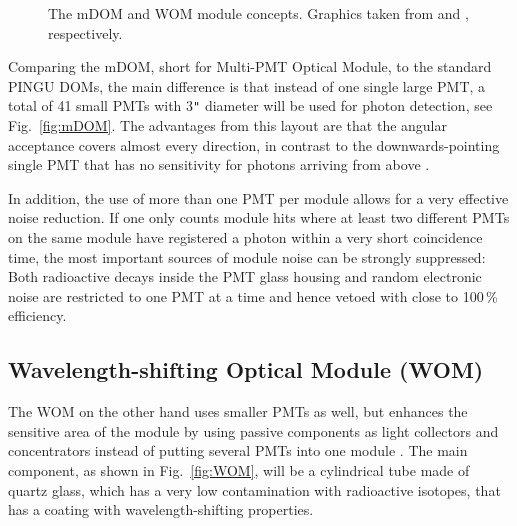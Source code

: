 
\begin{figure}
\centering
  \qquad
  \caption{The \protect{} mDOM and \protect{} WOM
    module concepts. Graphics taken from \cite{mDOM_Geneva} and \cite{WOM_ICRC},
    respectively.}
\label{fig:Gen3modules}
\end{figure}

Comparing the mDOM, short for Multi-PMT Optical Module, to the standard PINGU
DOMs, the main difference is that instead of one single large PMT, a total of
41 small PMTs with 3\verb+"+ diameter will be used for photon detection, see
Fig.~\ref{fig:mDOM}. The advantages from this layout are that the angular
acceptance covers almost every direction, in contrast to the downwards-pointing
single PMT that has no sensitivity for photons arriving from above
\cite{mDOM_Geneva}.

In addition, the use of more than one PMT per module allows for a very
effective noise reduction. If one only counts module hits where at least two
different PMTs on the same module have registered a photon within a very short
coincidence time, the most important sources of module noise can be strongly
suppressed: Both radioactive decays inside the PMT glass housing and random
electronic noise are restricted to one PMT at a time and hence vetoed with
close to 100\,\% efficiency.

\subsection{Wavelength-shifting Optical Module (WOM)}
\label{sec:WOM}

The WOM on the other hand uses smaller PMTs as well, but enhances the sensitive
area of the module by using passive components as light collectors and
concentrators instead of putting several PMTs into one module \cite{WOM_ICRC}.
The main component, as shown in Fig.~\ref{fig:WOM}, will be a cylindrical tube
made of quartz glass, which has a very low contamination with radioactive
isotopes, that has a coating with wavelength-shifting properties.

